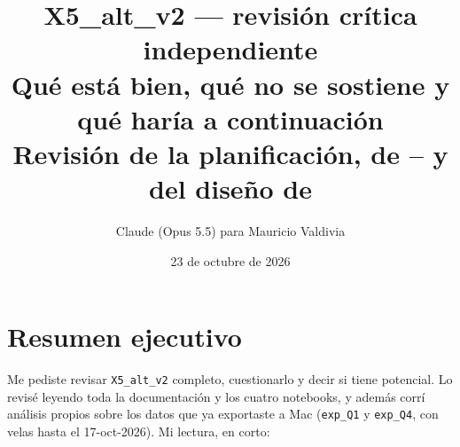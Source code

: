 \documentclass[11pt,a4paper]{article}
\title{\vspace{-1.6cm}\textbf{{\ttfamily X5\_alt\_v2} — revisión crítica independiente}\\[6pt]
  \large Qué está bien, qué no se sostiene y qué haría a continuación\\[4pt]
  \normalsize\color{cgris} Revisión de la planificación, de \code{X5\_Q1}–\code{X5\_Q4} y del diseño de \code{X5\_Q5}}
\author{Claude (Opus 5.5) para Mauricio Valdivia}
\date{23 de octubre de 2026}
\newcommand{\code}[1]{\texttt{\small #1}}
\begin{document}
\maketitle
\vspace{-0.6cm}

\section*{Resumen ejecutivo}

Me pediste revisar \code{X5\_alt\_v2} completo, cuestionarlo y decir si tiene potencial. Lo revisé
leyendo toda la documentación y los cuatro notebooks, y además corrí análisis propios sobre los
datos que ya exportaste a Mac (\code{exp\_Q1} y \code{exp\_Q4}, con velas hasta el 17-oct-2026).
Mi lectura, en corto:
\end{document}
